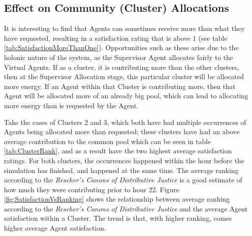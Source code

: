 \subsection*{Effect on Community (Cluster) Allocations}
It is interesting to find that Agents can sometimes receive more than what they have requested, resulting in a satisfaction rating that is above 1 (see table \ref{tab:SatisfactionMoreThanOne}). Opportunities such as these arise due to the holonic nature of the system, as the Supervisor Agent allocates fairly to the Virtual Agents. If as a cluster, it is contributing more than the other clusters, then at the Supervisor Allocation stage, this particular cluster will be allocated more energy. If an Agent within that Cluster is contributing more, then that Agent will be allocated more of an already big pool, which can lead to allocating more energy than is requested by the Agent. 

Take the cases of Clusters 2 and 3, which both have had multiple occurrences of Agents being allocated more than requested; these clusters have had an above average contribution to the common pool which can be seen in table \ref{tab:ClusterRank}, and as a result have the two highest average satisfaction ratings. For both clusters, the occurrences happened within the hour before the simulation has finished, and happened at the same time. The average ranking according to the \textit{Rescher's Canons of Distributive Justice} is a good estimate of how much they were contributing prior to hour 22. Figure \ref{fig:SatisfactionVsRanking} shows the relationship between average ranking according to the \textit{Rescher's Canons of Distributive Justice} and the average Agent satisfaction within a Cluster. The trend is that, with higher ranking, comes higher average Agent satisfaction.

